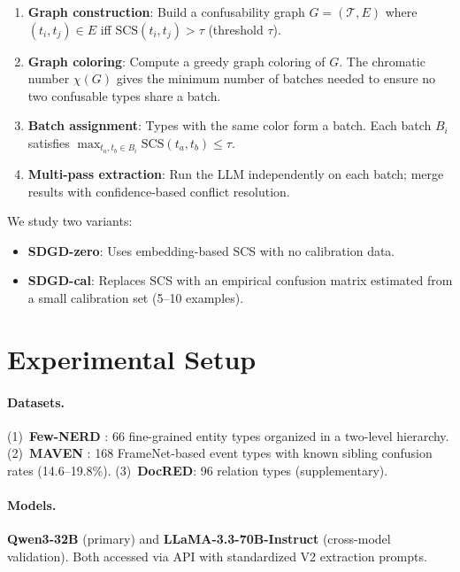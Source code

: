 \documentclass[11pt,a4paper]{article}
\begin{document}
\begin{enumerate}
    \item \textbf{Graph construction}: Build a confusability graph $G = (\mathcal{T}, E)$ where $(t_i, t_j) \in E$ iff $\text{SCS}(t_i, t_j) > \tau$ (threshold $\tau$).
    \item \textbf{Graph coloring}: Compute a greedy graph coloring of $G$. The chromatic number $\chi(G)$ gives the minimum number of batches needed to ensure no two confusable types share a batch.
    \item \textbf{Batch assignment}: Types with the same color form a batch. Each batch $B_i$ satisfies $\max_{t_a, t_b \in B_i} \text{SCS}(t_a, t_b) \leq \tau$.
    \item \textbf{Multi-pass extraction}: Run the LLM independently on each batch; merge results with confidence-based conflict resolution.
\end{enumerate}

We study two variants:
\begin{itemize}
    \item \textbf{SDGD-zero}: Uses embedding-based SCS with no calibration data.
    \item \textbf{SDGD-cal}: Replaces SCS with an empirical confusion matrix estimated from a small calibration set (5--10 examples).
\end{itemize}

\section{Experimental Setup}
\label{sec:setup}

\paragraph{Datasets.}
(1)~\textbf{Few-NERD} \cite{ding2021fewnerd}: 66 fine-grained entity types organized in a two-level hierarchy.
(2)~\textbf{MAVEN} \cite{wang2020maven}: 168 FrameNet-based event types with known sibling confusion rates (14.6--19.8\%).
(3)~\textbf{DocRED}: 96 relation types (supplementary).

\paragraph{Models.}
\textbf{Qwen3-32B} (primary) and \textbf{LLaMA-3.3-70B-Instruct} (cross-model validation). Both accessed via API with standardized V2 extraction prompts.
\end{document}
